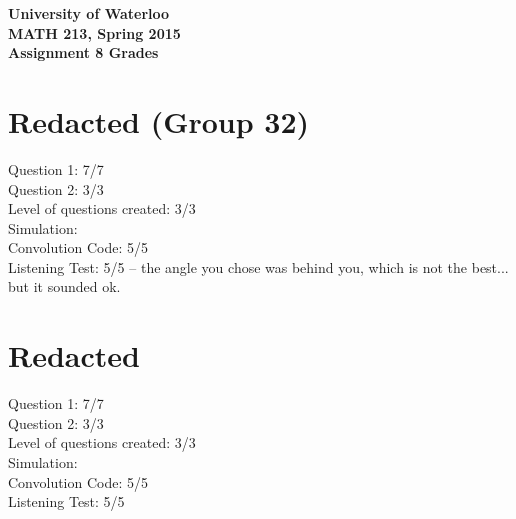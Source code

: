 \documentclass[12pt]{article}
\begin{document}
\begin{center}
{\Large\bf University of Waterloo}\\
\vspace{3mm}
{\Large\bf MATH 213, Spring 2015}\\
\vspace{2mm}
{\Large\bf Assignment 8 Grades}\\
\end{center}

\section*{Redacted (Group 32)}

Question 1: 7/7 \\
Question 2: 3/3 \\

\noindent Level of questions created: 3/3 \\

\noindent Simulation: \\
\indent Convolution Code: 5/5 \\
\indent Listening Test: 5/5 -- the angle you chose was behind you, which is not the best... but it sounded ok.

\section*{Redacted}

Question 1: 7/7 \\
Question 2: 3/3 \\

\noindent Level of questions created: 3/3 \\

\noindent Simulation: \\
\indent Convolution Code: 5/5 \\
\indent Listening Test: 5/5
\end{document}
